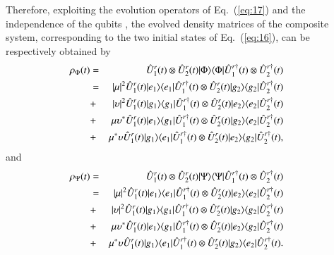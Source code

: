 \documentclass[twocolumn,3p,times]{elsarticle}
\begin{document}
Therefore, exploiting the evolution operators of Eq.~(\ref{eq:17}) and the independence of the qubits \cite{lofrancoreview,BLFC2007PRL}, the evolved density matrices of the composite system, corresponding to the two initial states of Eq.~(\ref{eq:16}), can be respectively obtained by
\begin{eqnarray}
\label{eq:18}
\hspace*{-0.5cm}
\rho_{\Phi}(t)&=&\hat U_{1}^{r}(t)\otimes\hat U_{2}^{r}(t)\lvert\Phi\rangle\langle\Phi\rvert\hat U_{1}^{r\dagger}(t)\otimes\hat U_{2}^{r\dagger}(t) \nonumber \\
&=&\lvert\mu\rvert^{2}\hat U_{1}^{r}(t)\lvert e_{1}\rangle\langle e_{1}\rvert\hat U_{1}^{r\dagger}(t)\otimes\hat U_{2}^{r}(t)\lvert g_{2}\rangle\langle g_{2}\rvert\hat U_{2}^{r\dagger}(t) \nonumber \\
&+&\lvert\upsilon\rvert^{2}\hat U_{1}^{r}(t)\lvert g_{1}\rangle\langle g_{1}\rvert\hat U_{1}^{r\dagger}(t)\otimes \hat U_{2}^{r}(t)\lvert e_{2}\rangle\langle e_{2}\rvert\hat U_{2}^{r\dagger}(t) \nonumber \\
&+& \mu\upsilon^{*}\hat U_{1}^{r}(t)\lvert e_{1}\rangle\langle g_{1}\rvert\hat U_{1}^{r\dagger}(t)\otimes \hat U_{2}^{r}(t)\lvert g_{2}\rangle\langle e_{2}\rvert\hat U_{2}^{r\dagger}(t)\nonumber \\
&+& \mu^{*}\upsilon\hat U_{1}^{r}(t)\lvert g_{1}\rangle\langle e_{1}\rvert\hat U_{1}^{r\dagger}(t)\otimes \hat U_{2}^{r}(t)\lvert e_{2}\rangle\langle g_{2}\rvert\hat U_{2}^{r\dagger}(t),\nonumber\\
\end{eqnarray}
and
\begin{eqnarray}
\label{eq:19}
\hspace*{-0.5cm}
\rho_{\Psi}(t)&=&\hat U_{1}^{r}(t)\otimes\hat U_{2}^{r}(t)\lvert\Psi\rangle\langle\Psi\rvert\hat U_{1}^{r\dagger}(t)\otimes\hat U_{2}^{r\dagger}(t) \nonumber \\
&=&\lvert\mu\rvert^{2}\hat U_{1}^{r}(t)\lvert e_{1}\rangle\langle e_{1}\rvert\hat U_{1}^{r\dagger}(t)\otimes \hat U_{2}^{r}(t)\lvert e_{2}\rangle\langle e_{2}\rvert\hat U_{2}^{r\dagger}(t)\nonumber \\
&+& \lvert\upsilon\rvert^{2}\hat U_{1}^{r}(t)\lvert g_{1}\rangle\langle g_{1}\rvert\hat U_{1}^{r\dagger}(t)\otimes \hat U_{2}^{r}(t)\lvert g_{2}\rangle\langle g_{2}\rvert\hat U_{2}^{r\dagger}(t)\nonumber \\
&+&\mu\upsilon^{*}\hat U_{1}^{r}(t)\lvert e_{1}\rangle\langle g_{1}\rvert\hat U_{1}^{r\dagger}(t)\otimes \hat U_{2}^{r}(t)\lvert e_{2}\rangle\langle g_{2}\rvert\hat U_{2}^{r\dagger}(t)\nonumber \\
&+& \mu^{*}\upsilon\hat U_{1}^{r}(t)\lvert g_{1}\rangle\langle e_{1}\rvert\hat U_{1}^{r\dagger}(t)\otimes \hat U_{2}^{r}(t)\lvert g_{2}\rangle\langle e_{2}\rvert\hat U_{2}^{r\dagger}(t).\nonumber\\
\end{eqnarray}
\end{document}
